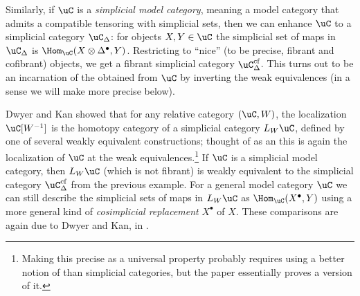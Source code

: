 \documentclass[a4paper,12pt]{article}
\begin{document}
\begin{ex}
  Similarly, if $\uC$ is a \emph{simplicial model category}, meaning a
  model category that admits a compatible tensoring with simplicial
  sets, then we can enhance $\uC$ to a simplicial category
  $\uC_{\Delta}$: for objects $X,Y \in \uC$ the simplicial set of maps
  in $\uC_{\Delta}$ is $\Hom_{\uC}(X \otimes \Delta^{\bullet},
  Y)$. Restricting to ``nice'' (to be precise, fibrant and cofibrant)
  objects, we get a fibrant simplicial category
  $\uC_{\Delta}^{\mathrm{cf}}$. This turns out to be an incarnation of
  the \icat{} obtained from $\uC$ by inverting the weak equivalences
  (in a sense we will make more precise below).
\end{ex}

\begin{ex}
  Dwyer and Kan \cite{DwyerKan1,DwyerKan2} showed that for any
  relative category $(\uC, W)$, the localization $\uC[W^{-1}]$ is the
  homotopy category of a simplicial category $L_{W}\uC$, defined by
  one of several weakly equivalent constructions; thought of as an
  \icat{} this is again the \icatl{} localization of $\uC$ at the weak
  equivalences.\footnote{Making this precise as a universal property
    probably requires using a better notion of \icats{} than
    simplicial categories, but the paper \cite{DwyerKanDiag}
    essentially proves a version of it.}  If $\uC$ is a simplicial
  model category, then $L_{W}\uC$ (which is not fibrant) is weakly
  equivalent to the simplicial category $\uC_{\Delta}^{\mathrm{cf}}$
  from the previous example.  For a general model category $\uC$ we
  can still describe the simplicial sets of maps in $L_{W}\uC$ as
  $\Hom_{\uC}(X^{\bullet}, Y)$ using a more general kind of
  \emph{cosimplicial replacement} $X^{\bullet}$ of $X$. These
  comparisons are again due to Dwyer and Kan, in \cite{DwyerKan3}.
\end{ex}
\end{document}
